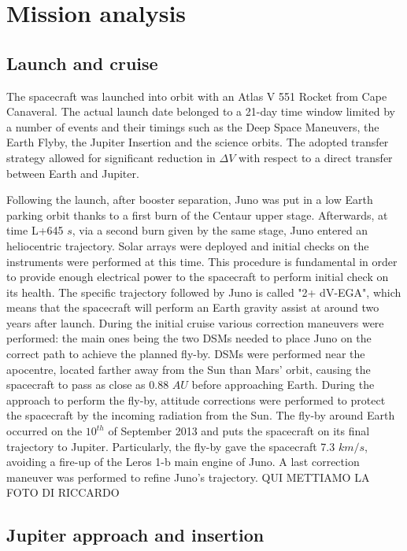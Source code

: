 \section{Mission analysis}
\label{sec:mission_analysis}

\subsection{Launch and cruise}
\label{sec: lancio e crociera}

The spacecraft was launched into orbit with an Atlas V 551 Rocket from Cape Canaveral. The actual launch date belonged to a 21-day time window limited by a number of events and their timings such as the Deep Space Maneuvers, the Earth Flyby, the Jupiter Insertion and the science orbits. The adopted transfer strategy allowed for significant reduction in $\Delta V$ with respect to a direct transfer between Earth and Jupiter.

Following the launch, after booster separation, Juno was put in a low Earth parking orbit thanks to a first burn of the Centaur upper stage. Afterwards, at time L+645 $s$, via a second burn given by the same stage, Juno entered an heliocentric trajectory. Solar arrays were deployed and initial checks on the instruments were performed at this time.  This procedure is fundamental in order to provide enough electrical power to the spacecraft to perform initial check on its health. 
The specific trajectory followed by Juno is called "2+ dV-EGA", which means that the spacecraft will perform an Earth gravity assist at around two years after launch.
During the initial cruise various correction maneuvers were performed: the main ones being the two DSMs needed to place Juno on the correct path to achieve the planned fly-by. 
DSMs were performed near the apocentre, located farther away from the Sun than Mars' orbit, causing the spacecraft to pass as close as 0.88 $AU$ before approaching Earth.  During the approach to perform the fly-by, attitude corrections were performed to protect the spacecraft by the incoming radiation from the Sun. 
The fly-by around Earth occurred on the $10^{th}$ of September 2013 and puts the spacecraft on its final trajectory to Jupiter. Particularly, the fly-by gave the spacecraft 7.3 $km/s$, avoiding a fire-up of the Leros 1-b main engine of Juno. A last correction maneuver was performed to refine Juno's trajectory.  QUI METTIAMO LA FOTO DI RICCARDO 

\subsection{Jupiter approach and insertion}
\label{sec: joi}


